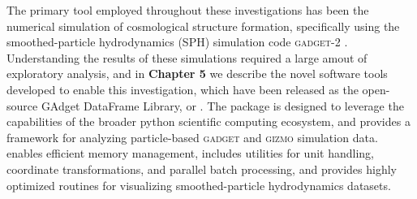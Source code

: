 \documentclass[../thesis.tex]{subfiles}
\begin{document}
The primary tool employed throughout these investigations has been the numerical simulation of cosmological structure formation, specifically using the smoothed-particle hydrodynamics (SPH) simulation code \textsc{gadget-2} \citep{Springel2005}.  
Understanding the results of these simulations required a large amout of exploratory analysis, and in \textbf{Chapter 5} we describe the novel software tools developed to enable this investigation, which have been released as the open-source GAdget DataFrame Library, or . The package is designed to leverage the capabilities of the broader python scientific computing ecosystem, and provides a framework for analyzing particle-based \textsc{gadget} and \textsc{gizmo} \citep{Hopkins2015} simulation data.   enables  efficient memory management, includes utilities for unit handling, coordinate transformations, and parallel batch processing, and provides highly optimized routines for visualizing smoothed-particle hydrodynamics datasets.
\end{document}
